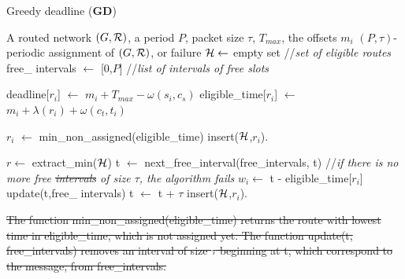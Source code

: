 \documentclass[10pt, conference, letterpaper]{IEEEtran}
\providecommand{\DIFaddtex}[1]{{\protect\color{blue}\uwave{#1}}} %
\providecommand{\DIFdeltex}[1]{{\protect\color{red}\sout{#1}}}                      %
\providecommand{\DIFaddbegin}{} %
\providecommand{\DIFaddend}{} %
\providecommand{\DIFdelbegin}{} %
\providecommand{\DIFdelend}{} %
\providecommand{\DIFadd}[1]{\texorpdfstring{\DIFaddtex{#1}}{#1}} %
\providecommand{\DIFdel}[1]{\texorpdfstring{\DIFdeltex{#1}}{}} %
\newcommand{\DIFscaledelfig}{0.5}
\newlength{\DIFdelgraphicswidth} %
\newlength{\DIFdelgraphicsheight} %
\newcommand{\DIFaddincludegraphics}[2][]{{\color{blue}\fbox{\DIFOincludegraphics[#1]{#2}}}} %
\newcommand{\DIFdelincludegraphics}[2][]{%
\sbox{\DIFdelgraphicsbox}{\DIFOincludegraphics[#1]{#2}}%
\settoboxwidth{\DIFdelgraphicswidth}{\DIFdelgraphicsbox} %
\settoboxtotalheight{\DIFdelgraphicsheight}{\DIFdelgraphicsbox} %
\scalebox{\DIFscaledelfig}{%
\parbox[b]{\DIFdelgraphicswidth}{\usebox{\DIFdelgraphicsbox}\\[-\baselineskip] \rule{\DIFdelgraphicswidth}{0em}}\llap{\resizebox{\DIFdelgraphicswidth}{\DIFdelgraphicsheight}{%
\setlength{\unitlength}{\DIFdelgraphicswidth}%
\begin{picture}(1,1)%
\thicklines\linethickness{2pt} %
{\color[rgb]{1,0,0}\put(0,0){\framebox(1,1){}}}%
{\color[rgb]{1,0,0}\put(0,0){\line( 1,1){1}}}%
{\color[rgb]{1,0,0}\put(0,1){\line(1,-1){1}}}%
\end{picture}%
}\hspace*{3pt}}} %
} %
\DeclareRobustCommand{\DIFaddbegin}{\DIFOaddbegin \let\includegraphics\DIFaddincludegraphics} %
\DeclareRobustCommand{\DIFaddend}{\DIFOaddend \let\includegraphics\DIFOincludegraphics} %
\DeclareRobustCommand{\DIFdelbegin}{\DIFOdelbegin \let\includegraphics\DIFdelincludegraphics} %
\DeclareRobustCommand{\DIFdelend}{\DIFOaddend \let\includegraphics\DIFOincludegraphics} %
\begin{document}
      \DIFaddend \begin{algorithm}\DIFaddbegin \label{alg:GD}
     \DIFaddend \caption{ Greedy deadline ({\bf GD}) }
     \begin{algorithmic}
     \REQUIRE A routed network $(G,{\cal R})$, a period $P$, packet size $\tau$, $ T_{max}$, the offsets $m_i$
     \ENSURE $(P,\tau)$-periodic assignment of $(G,{\cal R})$, or failure
    \STATE  ${\cal H} \leftarrow$ empty set //{\em set of eligible routes}
        \STATE  free\_ intervals $\leftarrow$ [0,$P$] //{\em list of intervals of free slots}

     \STATE  deadline[$r_i$]  $\leftarrow$  $m_{i} + T_{max} - \omega(s_i,c_s)$
     \STATE  eligible\_time[$r_i$] $\leftarrow$ $m_{i} +  \lambda(r_i) + \omega(c_t,t_i)$
       \ENDFOR

       \STATE $r_i$ $\leftarrow $ min\_non\_assigned(eligible\_time)
       \STATE insert(${\cal H}$,$r_i$).
       \ENDIF

       \STATE $r \leftarrow $ extract\_min(${\cal H}$)
       \STATE t $\leftarrow$ next\_free\_interval(free\_intervals, t) //{\em if there is no more free \DIFdelbegin \DIFdel{intervals }\DIFdelend \DIFaddbegin \DIFadd{interval }\DIFaddend of size $\tau$, the algorithm fails}
       \STATE $w_i \leftarrow$ t - eligible\_time[$r_i$]
       \STATE update(t,free\_ intervals)
       \STATE t $\leftarrow$ t + $\tau$
 \STATE insert(${\cal H}$,$r_i$).
       \ENDFOR
       \ENDWHILE

     
 
     \end{algorithmic}
     \end{algorithm}
\DIFdelbegin \DIFdel{The function  min\_non\_assigned(eligible\_time) returns the route with lowest time in eligible\_time, which is not assigned yet. The function update(t, free\_intervals) removes an interval of size $\tau$ beginning at t, which correspond to the message,  from free\_intervals.
    }\DIFdelend 
\end{document}

